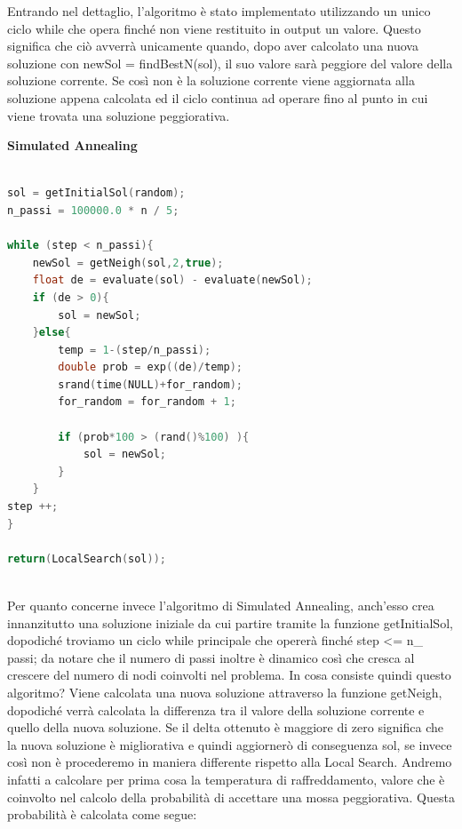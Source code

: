 \documentclass[preprint,12pt]{elsarticle}
\begin{document}
Entrando nel dettaglio, l'algoritmo è stato implementato utilizzando un unico ciclo while che opera finché non viene restituito in output un valore. Questo significa che ciò avverrà unicamente quando, dopo aver calcolato una nuova soluzione con newSol = findBestN(sol), il suo valore sarà peggiore del valore della soluzione corrente. Se così non è la soluzione corrente viene aggiornata alla soluzione appena calcolata ed il ciclo continua ad operare fino al punto in cui viene trovata una soluzione peggiorativa. \\

\begin{large}
\textbf{Simulated Annealing}
\end{large}


\begin{lstlisting}[basicstyle=\small, caption={Simulated Annealing}, frame=single, language=C++]

sol = getInitialSol(random);
n_passi = 100000.0 * n / 5;

while (step < n_passi){
	newSol = getNeigh(sol,2,true);			
	float de = evaluate(sol) - evaluate(newSol);
	if (de > 0){
		sol = newSol;
	}else{ 
		temp = 1-(step/n_passi);	
		double prob = exp((de)/temp);	
		srand(time(NULL)+for_random);		
		for_random = for_random + 1;
		
		if (prob*100 > (rand()%100) ){
			sol = newSol;
		}
	}
step ++; 
}

return(LocalSearch(sol));
	
\end{lstlisting}

Per quanto concerne invece l'algoritmo di Simulated Annealing, anch'esso crea innanzitutto una soluzione iniziale da cui partire tramite la funzione getInitialSol, dopodiché troviamo un ciclo while principale che opererà finché step <= n\_
passi; da notare che il numero di passi inoltre è dinamico così che cresca al crescere del numero di nodi coinvolti nel problema. In cosa consiste quindi questo algoritmo? Viene calcolata una nuova soluzione attraverso la funzione getNeigh, dopodiché verrà calcolata la differenza tra il valore della soluzione corrente e quello della nuova soluzione. Se il delta ottenuto è maggiore di zero significa che la nuova soluzione è migliorativa e quindi aggiornerò di conseguenza sol, se invece così non è procederemo in maniera differente rispetto alla Local Search. Andremo infatti a calcolare per prima cosa la temperatura di raffreddamento, valore che è coinvolto nel calcolo della probabilità di accettare una mossa peggiorativa. Questa probabilità è calcolata come segue:
\end{document}
